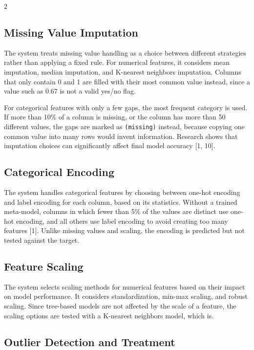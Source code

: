 \documentclass[11pt,a4paper]{article}
\begin{document}
\begin{multicols}{2}
\subsection{Missing Value Imputation}

The system treats missing value handling as a choice between different strategies rather than applying a fixed rule. For numerical features, it considers mean imputation, median imputation, and K-nearest neighbors imputation. Columns that only contain 0 and 1 are filled with their most common value instead, since a value such as 0.67 is not a valid yes/no flag.

For categorical features with only a few gaps, the most frequent category is used. If more than 10\% of a column is missing, or the column has more than 50 different values, the gaps are marked as \texttt{(missing)} instead, because copying one common value into many rows would invent information. Research shows that imputation choices can significantly affect final model accuracy [1, 10].


\subsection{Categorical Encoding}

The system handles categorical features by choosing between one-hot encoding and label encoding for each column, based on its statistics. Without a trained meta-model, columns in which fewer than 5\% of the values are distinct use one-hot encoding, and all others use label encoding to avoid creating too many features [1]. Unlike missing values and scaling, the encoding is predicted but not tested against the target.


\subsection{Feature Scaling}

The system selects scaling methods for numerical features based on their impact on model performance. It considers standardization, min-max scaling, and robust scaling. Since tree-based models are not affected by the scale of a feature, the scaling options are tested with a K-nearest neighbors model, which is.


\subsection{Outlier Detection and Treatment}


\end{multicols}
\end{document}
